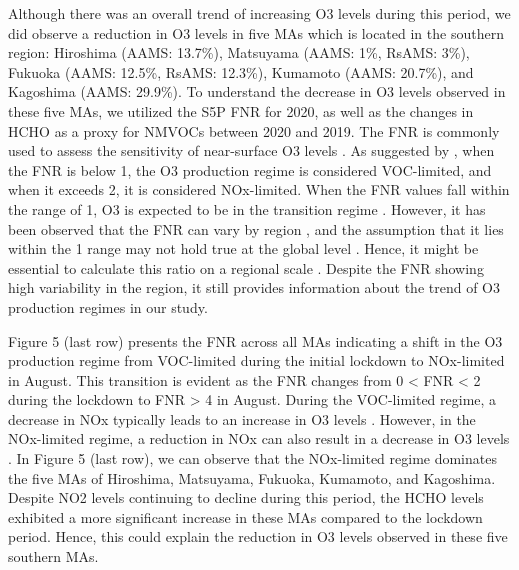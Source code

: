 Although there was an overall trend of increasing O3 levels during this period, we did observe a reduction in O3 levels in five MAs which is located in the southern region: Hiroshima (AAMS: 13.7\%), Matsuyama (AAMS: 1\%, RsAMS: 3\%), Fukuoka (AAMS: 12.5\%, RsAMS: 12.3\%), Kumamoto (AAMS: 20.7\%), and Kagoshima (AAMS: 29.9\%). To understand the decrease in O3 levels observed in these five MAs, we utilized the S5P FNR for 2020, as well as the changes in HCHO as a proxy for NMVOCs between 2020 and 2019. The FNR is commonly used to assess the sensitivity of near-surface O3 levels \citep{martin2004space}. As suggested by \citep{duncan2010application}, when the FNR is below 1, the O3 production regime is considered VOC-limited, and when it exceeds 2, it is considered NOx-limited. When the FNR values fall within the range of 1, O3 is expected to be in the transition regime \citep{duncan2010application}. However, it has been observed that the FNR can vary by region \citep{jin2020inferring,irie2021continuous,souri2023characterization,ren2022diagnosing}, and the assumption that it lies within the 1 range may not hold true at the global level \citep{schroeder2017new}. Hence, it might be essential to calculate this ratio on a regional scale \citep{damiani2022peculiar,schroeder2017new}. Despite the FNR showing high variability in the region, it still provides information about the trend of O3 production regimes in our study. \par
Figure 5 (last row) presents the FNR across all MAs indicating a shift in the O3 production regime from VOC-limited during the initial lockdown to NOx-limited in August. This transition is evident as the FNR changes from 0 < FNR < 2 during the lockdown to FNR > 4 in August. During the VOC-limited regime, a decrease in NOx typically leads to an increase in O3 levels \citep{duncan2010application}. However, in the NOx-limited regime, a reduction in NOx can also result in a decrease in O3 levels \citep{duncan2010application}. In Figure 5 (last row), we can observe that the NOx-limited regime dominates the five MAs of Hiroshima, Matsuyama, Fukuoka, Kumamoto, and Kagoshima. Despite NO2 levels continuing to decline during this period, the HCHO levels exhibited a more significant increase in these MAs compared to the lockdown period. Hence, this could explain the reduction in O3 levels observed in these five southern MAs. \par
